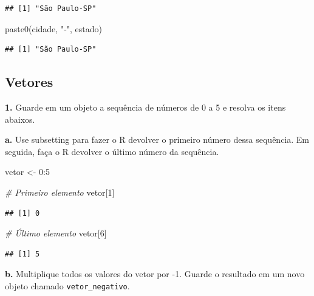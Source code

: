 \documentclass[
]{book}
\newenvironment{Shaded}{\begin{snugshade}}{\end{snugshade}}
\newcommand{\CommentTok}[1]{\textcolor[rgb]{0.56,0.35,0.01}{\textit{#1}}}
\newcommand{\DecValTok}[1]{\textcolor[rgb]{0.00,0.00,0.81}{#1}}
\newcommand{\FunctionTok}[1]{\textcolor[rgb]{0.00,0.00,0.00}{#1}}
\newcommand{\NormalTok}[1]{#1}
\newcommand{\OtherTok}[1]{\textcolor[rgb]{0.56,0.35,0.01}{#1}}
\newcommand{\SpecialCharTok}[1]{\textcolor[rgb]{0.00,0.00,0.00}{#1}}
\newcommand{\StringTok}[1]{\textcolor[rgb]{0.31,0.60,0.02}{#1}}
\begin{document}
\begin{verbatim}
## [1] "São Paulo-SP"
\end{verbatim}

\begin{Shaded}
\begin{Highlighting}[]
\FunctionTok{paste0}\NormalTok{(cidade, }\StringTok{"{-}"}\NormalTok{, estado)}
\end{Highlighting}
\end{Shaded}

\begin{verbatim}
## [1] "São Paulo-SP"
\end{verbatim}

\hypertarget{vetores-1}{%
\subsection*{Vetores}\label{vetores-1}}

\textbf{1.} Guarde em um objeto a sequência de números de 0 a 5 e resolva os itens abaixos.

\textbf{a.} Use subsetting para fazer o R devolver o primeiro número dessa sequência. Em seguida, faça o R devolver o último número da sequência.

\begin{Shaded}
\begin{Highlighting}[]
\NormalTok{vetor }\OtherTok{\textless{}{-}} \DecValTok{0}\SpecialCharTok{:}\DecValTok{5}

\CommentTok{\# Primeiro elemento}
\NormalTok{vetor[}\DecValTok{1}\NormalTok{]}
\end{Highlighting}
\end{Shaded}

\begin{verbatim}
## [1] 0
\end{verbatim}

\begin{Shaded}
\begin{Highlighting}[]
\CommentTok{\# Último elemento}
\NormalTok{vetor[}\DecValTok{6}\NormalTok{]}
\end{Highlighting}
\end{Shaded}

\begin{verbatim}
## [1] 5
\end{verbatim}

\textbf{b.} Multiplique todos os valores do vetor por -1. Guarde o resultado em
um novo objeto chamado \texttt{vetor\_negativo}.
\end{document}
